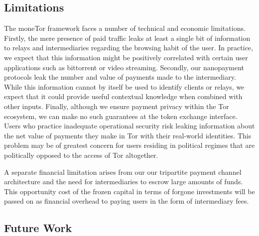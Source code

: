 \subsection{Limitations}
\label{subsec:limitations}

The moneTor framework faces a number of technical and economic limitations.
Firstly, the mere presence of paid traffic leaks at least a single bit of
information to relays and intermediaries regarding the browsing habit of the
user. In practice, we expect that this information might be positively
correlated with certain user applications such as bittorrent or video streaming.
Secondly, our nanopayment protocols leak the number and value of payments made
to the intermediary. While this information cannot by itself be used to identify
clients or relays, we expect that it could provide useful contextual knowledge
when combined with other inputs. Finally, although we ensure payment privacy
within the Tor ecosystem, we can make no such guarantees at the token exchange
interface. Users who practice inadequate operational security risk leaking
information about the net value of payments they make in Tor with their
real-world identities. This problem may be of greatest concern for users
residing in political regimes that are politically opposed to the access of Tor
altogether.

A separate financial limitation arises from our our tripartite payment channel
architecture and the need for intermediaries to escrow large amounts of funds.
This opportunity cost of the frozen capital in terms of forgone investments will
be passed on as financial overhead to paying users in the form of intermediary
fees.

\subsection{Future Work}
\label{subsec:future_work}


